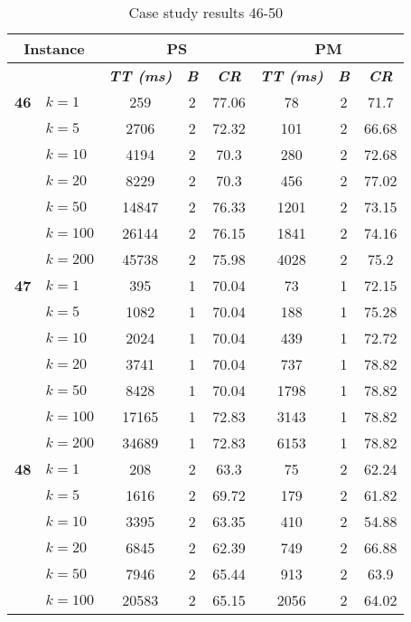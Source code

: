     \begin{table}[htbp]
    \caption{Case study results 46-50}
    \centering
    \begin{tabular}{|l|l|c|c|c|c|c|c|}
    \hline
    \multicolumn{ 2}{|c|}{\textbf{Instance}} & \multicolumn{ 3}{c|}{\textbf{PS}} & \multicolumn{ 3}{c|}{\textbf{PM}} \\ \hline
    \multicolumn{ 2}{|l|}{} & \textbf{\textit{TT (ms)}} & \textbf{\textit{B}} & \textbf{\textit{CR}} & \textbf{\textit{TT (ms)}} & \textbf{\textit{B}} & \textbf{\textit{CR}} \\ \hline
    \multicolumn{1}{|r|}{\textbf{46}} & $k=1$ & 259 & 2 & 77.06 & 78 & 2 & 71.7 \\ 
     & $k=5$ & 2706 & 2 & 72.32 & 101 & 2 & 66.68 \\ 
     & $k=10$ & 4194 & 2 & 70.3 & 280 & 2 & 72.68 \\ 
     & $k=20$ & 8229 & 2 & 70.3 & 456 & 2 & 77.02 \\ 
     & $k=50$ & 14847 & 2 & 76.33 & 1201 & 2 & 73.15 \\ 
     & $k=100$ & 26144 & 2 & 76.15 & 1841 & 2 & 74.16 \\ 
     & $k=200$ & 45738 & 2 & 75.98 & 4028 & 2 & 75.2 \\ \hline
    \multicolumn{1}{|r|}{\textbf{47}} & $k=1$ & 395 & 1 & 70.04 & 73 & 1 & 72.15 \\ 
     & $k=5$ & 1082 & 1 & 70.04 & 188 & 1 & 75.28 \\ 
     & $k=10$ & 2024 & 1 & 70.04 & 439 & 1 & 72.72 \\ 
     & $k=20$ & 3741 & 1 & 70.04 & 737 & 1 & 78.82 \\ 
     & $k=50$ & 8428 & 1 & 70.04 & 1798 & 1 & 78.82 \\ 
     & $k=100$ & 17165 & 1 & 72.83 & 3143 & 1 & 78.82 \\ 
     & $k=200$ & 34689 & 1 & 72.83 & 6153 & 1 & 78.82 \\ \hline
    \multicolumn{1}{|r|}{\textbf{48}} & $k=1$ & 208 & 2 & 63.3 & 75 & 2 & 62.24 \\ 
     & $k=5$ & 1616 & 2 & 69.72 & 179 & 2 & 61.82 \\ 
     & $k=10$ & 3395 & 2 & 63.35 & 410 & 2 & 54.88 \\ 
     & $k=20$ & 6845 & 2 & 62.39 & 749 & 2 & 66.88 \\ 
     & $k=50$ & 7946 & 2 & 65.44 & 913 & 2 & 63.9 \\ 
     & $k=100$ & 20583 & 2 & 65.15 & 2056 & 2 & 64.02 \\ 

\end{tabular}
\end{table}
